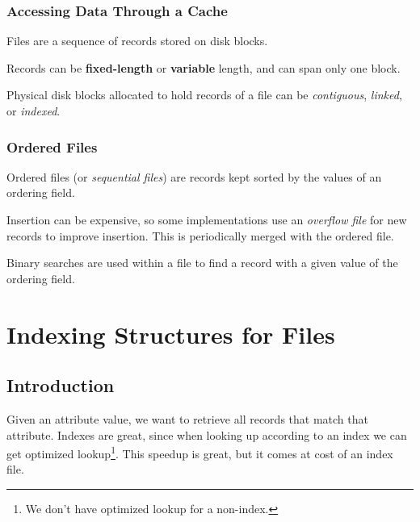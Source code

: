                 \subsection{Accessing Data Through a Cache} %
                \label{sub:accessing_data_through_a_cache}
                    Files are a sequence of records stored on disk blocks.

                    Records can be \textbf{fixed-length} or \textbf{variable} length, and can span only one block.

                    Physical disk blocks allocated to hold records of a file can be \textit{contiguous}, \textit{linked}, or \textit{indexed}.
                \subsection{Ordered Files} %
                \label{sub:ordered_files}
                    Ordered files (or \textit{sequential files}) are records kept sorted by the values of an ordering field.

                    Insertion can be expensive,
					so some implementations use an \textit{overflow file} for new records to improve insertion.
					This is periodically merged with the ordered file.

                    Binary searches are used within a file to find a record with a given value of the ordering field.
        \chapter{Indexing Structures for Files} %
        \label{cha:indexing_structures_for_files}
            \section{Introduction} %
            \label{sec:introduction}
                Given an attribute value, we want to retrieve all records that match that attribute.
                Indexes are great, 
				since when looking up according to an index we can get optimized lookup\footnote{We don't have optimized lookup for a non-index.}.
                This speedup is great, but it comes at cost of an index file.
